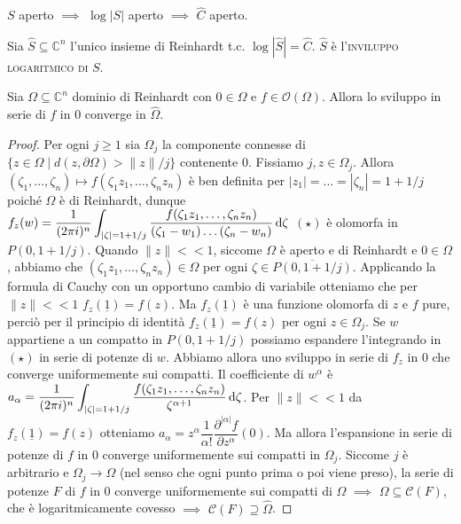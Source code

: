\begin{oss}
  $S$ aperto $\implies$ $\log{|S|}$ aperto $\implies$ $\hat{C}$ aperto.
\end{oss}

\begin{defn}
  Sia $\hat{S} \subseteq \mathbb{C}^n$ l'unico insieme di Reinhardt t.c. $\log{|\hat{S}|}=\hat{C}$. $\hat{S}$ è l'\textsc{inviluppo logaritmico di $S$}.
\end{defn}

\begin{prop}
  Sia $\Omega \subseteq \mathbb{C}^n$ dominio di Reinhardt con $0 \in \Omega$ e $f \in \mathcal{O}(\Omega)$. Allora lo sviluppo in serie di $f$ in $0$ converge in $\hat{\Omega}$.
\end{prop}

\begin{proof}
  Per ogni $j \ge 1$ sia $\Omega_j$ la componente connesse di $\{z \in \Omega \mid d(z,\partial\Omega)>\|z\|/j\}$ contenente $0$. Fissiamo $j, z \in \Omega_j$.
  Allora $(\zeta_1, \dots, \zeta_n) \longmapsto f(\zeta_1z_1,\dots,\zeta_nz_n)$ è ben definita per $|z_1|=\dots=|\zeta_n|=1+1/j$ poiché $\Omega$ è di Reinhardt, dunque $\displaystyle f_z(w)=\frac{1}{(2\pi i)^n} \int_{|\zeta|=1+1/j} \frac{f(\zeta_1z_1, \dots, \zeta_nz_n)}{(\zeta_1-w_1)\dots(\zeta_n-w_n)}\mathop{}\!\mathrm{d} \zeta$ $(\star)$ è olomorfa in $P(0, 1+1/j)$.
  Quando $\|z\|<<1$, siccome $\Omega$ è aperto e di Reinhardt e $0 \in \Omega$, abbiamo che $(\zeta_1z_1,\dots,\zeta_nz_n) \in \Omega$  per ogni $\zeta \in \overline{P(0,1+1/j)}$. Applicando la formula di Cauchy con un opportuno cambio di variabile otteniamo che per $\|z\| << 1$ $f_z(\underline{1})=f(z)$.
  Ma $f_z(\underline{1})$ è una funzione olomorfa di $z$ e $f$ pure, perciò per il principio di identità $f_z(\underline{1})=f(z)$ per ogni $z \in \Omega_j$. Se $w$ appartiene a un compatto in $P(0, 1+1/j)$ possiamo espandere l'integrando in $(\star)$ in serie di potenze di $w$. Abbiamo allora uno sviluppo in serie di $f_z$ in $0$ che converge uniformemente sui compatti.
  Il coefficiente di $w^\alpha$ è $\displaystyle a_{\alpha}=\frac{1}{(2\pi i)^n}\int_{|\zeta|=1+1/j} \frac{f(\zeta_1z_1,\dots,\zeta_nz_n)}{\zeta^{\alpha+1}}\mathop{}\!\mathrm{d}\zeta$. Per $\|z\|<<1$ da $f_z(\underline{1})=f(z)$ otteniamo $a_\alpha=z^\alpha\dfrac{1}{\alpha!}\dfrac{\partial^{|\alpha|}f}{\partial z^\alpha}(0)$.
  Ma allora l'espansione in serie di potenze di $f$ in $0$ converge uniformemente sui compatti in $\Omega_j$. Siccome $j$ è arbitrario e $\Omega_j \longrightarrow \Omega$ (nel senso che ogni punto prima o poi viene preso), la serie di potenze $F$ di $f$ in $0$ converge uniformemente sui compatti di $\Omega$ $\implies$ $\Omega \subseteq \mathcal{C}(F)$, che è logaritmicamente covesso $\implies$ $\mathcal{C}(F) \supseteq \hat{\Omega}$.
\end{proof}
